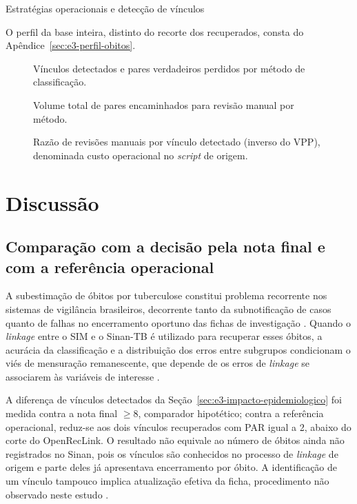 \begin{chapter}{Estratégias operacionais e detecção de vínculos}




O perfil da base inteira, distinto do recorte dos recuperados, consta do Apêndice~\ref{sec:e3-perfil-obitos}.

\begin{figure}[!ht]
\centering

\caption{Vínculos detectados e pares verdadeiros perdidos por método de classificação.}
\label{fig:epi-deteccao}
\end{figure}

\begin{figure}[!ht]
\centering

\caption{Volume total de pares encaminhados para revisão manual por método.}
\label{fig:epi-revisoes}
\end{figure}

\begin{figure}[!ht]
\centering

\caption{Razão de revisões manuais por vínculo detectado (inverso do VPP), denominada custo operacional no \textit{script} de origem.}
\label{fig:epi-custo}
\end{figure}

\section{Discussão}\label{sec:e3-discussao}

\subsection{Comparação com a decisão pela nota final e com a referência operacional}\label{sec:e3-discussao-impacto}

A subestimação de óbitos por tuberculose constitui problema recorrente nos sistemas de vigilância brasileiros, decorrente tanto da subnotificação de casos quanto de falhas no encerramento oportuno das fichas de investigação \cite{Bartholomay2014improved, Santos2018underreporting}. Quando o \textit{linkage} entre o SIM e o Sinan-TB é utilizado para recuperar esses óbitos, a acurácia da classificação e a distribuição dos erros entre subgrupos condicionam o viés de mensuração remanescente, que depende de os erros de \textit{linkage} se associarem às variáveis de interesse \cite{Doidge2019linkageerror, Shaw2022biases}.

A diferença de vínculos detectados da Seção~\ref{sec:e3-impacto-epidemiologico} foi medida contra a nota final $\geq 8$, comparador hipotético; contra a referência operacional, reduz-se aos dois vínculos recuperados com PAR igual a 2, abaixo do corte do OpenRecLink. O resultado não equivale ao número de óbitos ainda não registrados no Sinan, pois os vínculos são conhecidos no processo de \textit{linkage} de origem e parte deles já apresentava encerramento por óbito. A identificação de um vínculo tampouco implica atualização efetiva da ficha, procedimento não observado neste estudo \cite{Lima2020tbquality}.


\end{chapter}
